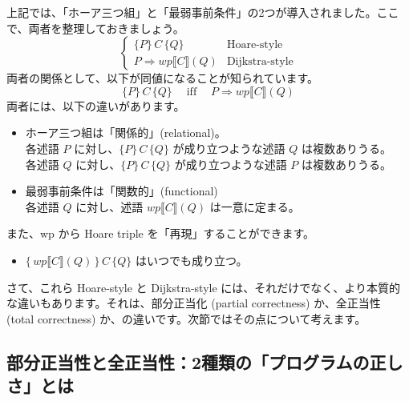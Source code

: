 \documentclass[
		head_space=20mm,
		foot_space=20mm,
		gutter=10mm,
		line_length=190mm
]{jlreq}
\begin{document}
\noindent 
上記では、「ホーア三つ組」と「最弱事前条件」の2つが導入されました。ここで、両者を整理しておきましょう。
\[\begin{cases}\{P\}\,C\,\{Q\} & \textrm{Hoare-style}\\P\Rightarrow wp\llbracket C\rrbracket(Q) & \textrm{Dijkstra-style}\end{cases}\]
両者の関係として、以下が同値になることが知られています。
\[\{P\}\,C\,\{Q\} \quad\;\textrm{iff}\;\quad P\Rightarrow wp\llbracket C\rrbracket(Q)\] 
両者には、以下の違いがあります。
\begin{itemize}
	\item ホーア三つ組は「関係的」(relational)。 \\
	\quad 各述語 $P$ に対し、$\{P\}\,C\,\{Q\}$ が成り立つような述語 $Q$ は複数ありうる。\\
	\quad 各述語 $Q$ に対し、$\{P\}\,C\,\{Q\}$ が成り立つような述語 $P$ は複数ありうる。
	\item 最弱事前条件は「関数的」(functional) \\
	\quad 各述語 $Q$ に対し、述語 $wp\llbracket C\rrbracket(Q)$ は一意に定まる。
\end{itemize}
また、wp から Hoare triple を「再現」することができます。
\begin{itemize}
	\item $\{\,wp\llbracket C\rrbracket(Q)\,\}\,C\,\{Q\}$ はいつでも成り立つ。
\end{itemize}

さて、これら Hoare-style と Dijkstra-style には、それだけでなく、より本質的な違いもあります。それは、部分正当化 (partial correctness) か、全正当性 (total correctness) か、の違いです。次節ではその点について考えます。\vspace{3pt}

\subsection{部分正当性と全正当性：2種類の「プログラムの正しさ」とは}
\end{document}
